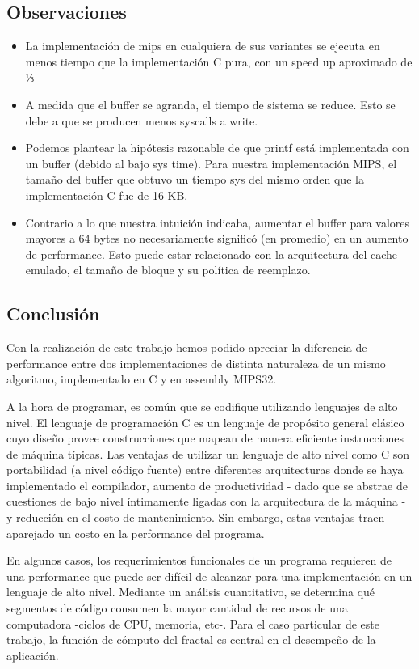 \documentclass{article}
\begin{document}
\subsection{Observaciones}
\begin{itemize}
\item La implementación de mips en cualquiera de sus variantes se ejecuta en menos tiempo que la implementación C pura, con un speed up aproximado de ⅓
\item A medida que el buffer se agranda, el tiempo de sistema se reduce. Esto se debe a que se producen menos syscalls a write.
\item Podemos plantear la hipótesis razonable de que printf está implementada con un buffer (debido al bajo sys time). Para nuestra implementación MIPS, el tamaño del buffer que obtuvo un tiempo sys del mismo orden que la implementación C fue de 16 KB.
\item Contrario a lo que nuestra intuición indicaba, aumentar el buffer para valores mayores a 64 bytes no necesariamente significó (en promedio) en un aumento de performance. Esto puede estar relacionado con la arquitectura del cache emulado, el tamaño de bloque  y su política de reemplazo.
\end{itemize}

\clearpage
\subsection{Conclusión}


Con la realización de este trabajo hemos podido apreciar la diferencia de performance entre dos implementaciones de distinta naturaleza de un mismo algoritmo, implementado en C y en assembly MIPS32.


A la hora de programar, es común que se codifique utilizando lenguajes de alto nivel. El lenguaje de programación C es un lenguaje de propósito general clásico cuyo diseño provee construcciones que mapean de manera eficiente instrucciones de máquina típicas. Las ventajas de utilizar un lenguaje de alto nivel como C son portabilidad (a nivel código fuente) entre diferentes arquitecturas donde se haya implementado el compilador, aumento de productividad - dado que se abstrae de cuestiones de bajo nivel íntimamente ligadas con la arquitectura de la máquina - y reducción en el costo de mantenimiento. Sin embargo, estas ventajas traen aparejado un costo en la performance del programa.


En algunos casos, los requerimientos funcionales de un programa requieren de una performance que puede ser difícil de alcanzar para una implementación en un lenguaje de alto nivel. Mediante un análisis cuantitativo, se determina qué segmentos de código consumen la mayor cantidad de recursos de una computadora -ciclos de CPU, memoria, etc-. Para el caso particular de este trabajo, la función de cómputo del fractal es central en el desempeño de la aplicación.
\end{document}
